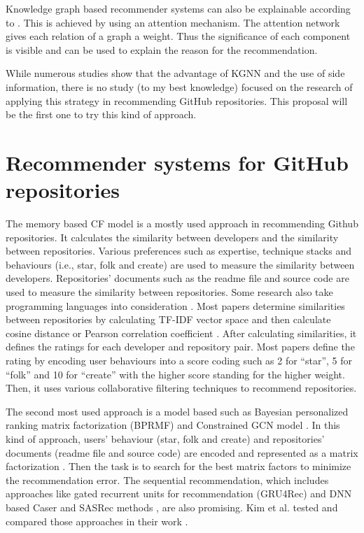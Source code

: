 \documentclass[11pt,twoside]{report}
\begin{document}
Knowledge graph based recommender systems can also be explainable according to \cite{guo_survey_2020}. This is achieved by using an attention mechanism. The attention network gives each relation of a graph a weight. Thus the significance of each component is visible and can be used to explain the reason for the recommendation.

While numerous studies show that the advantage of KGNN and the use of side information, there is no study (to my best knowledge) focused on the research of applying this strategy in recommending GitHub repositories. This proposal will be the first one to try this kind of approach.


\section{Recommender systems for GitHub repositories}
The memory based CF model is a mostly used approach in recommending Github repositories. It calculates the similarity between developers and the similarity between repositories. Various preferences such as expertise, technique stacks and behaviours (i.e., star, folk and create) are used to measure the similarity between developers. Repositories' documents such as the readme file and source code are used to measure the similarity between repositories. Some research also take programming languages into consideration \cite{inka_open_2018, sun_personalized_2018}. Most papers determine similarities between repositories by calculating TF-IDF vector space and then calculate cosine distance or Pearson correlation coefficient \cite{mansur_review_nodate, kim_sequential_2021}. After calculating similarities, it defines the ratings for each developer and repository pair. Most papers define the rating by encoding user behaviours into a score coding such as 2 for “star”, 5 for “folk” and 10 for “create” with the higher score standing for the higher weight. Then, it uses various collaborative filtering techniques to recommend repositories.

The second most used approach is a model based such as Bayesian personalized ranking matrix factorization (BPRMF) \cite{jiang_open_2017} and Constrained GCN model \cite{shao_paper2repo_2020}. In this kind of approach, users’ behaviour (star, folk and create) and repositories’ documents (readme file and source code) are encoded and represented as a matrix factorization \cite{jiang_open_2017}. Then the task is to search for the best matrix factors to minimize the recommendation error. The sequential recommendation, which includes approaches like gated recurrent units for recommendation (GRU4Rec) and DNN based Caser and SASRec methods \cite{kim_sequential_2021}, are also promising. Kim et al. \cite{kim_sequential_2021} tested and compared those approaches in their work \cite{kim_sequential_2021}.
\end{document}
